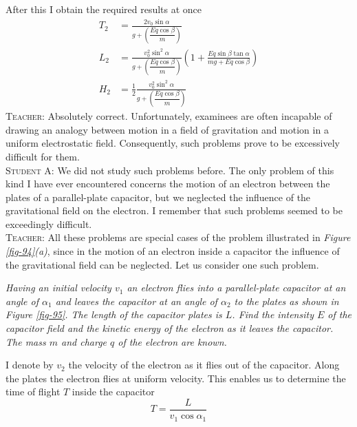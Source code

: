 \documentclass[a4paper,sfsidenotes]{tufte-book}
\begin{document}
After this I obtain the required results at once
\begin{align}%
T_{2} & = \frac{2 v_{0} \sin \alpha}{ g +  \left(\dfrac{E q \cos \beta}{m} \right)} \label{eq-144}\\
L_{2} &= \frac{ v_{0}^{2} \sin^{2} \alpha}{g +  \left(\dfrac{E q \cos \beta}{m} \right)} \left(1 + \frac{Eq \sin \beta \tan \alpha}{mg + Eq \cos \beta} \right) \label{eq-145}\\
H_{2} &=\frac{1}{2} \frac{v_{0}^{2} \sin^{2} \alpha}{g +  \left(\dfrac{E q \cos \beta}{m} \right)} \label{eq-146}
\end{align} 
\textsc{Teacher:} Absolutely correct. Unfortunately, examinees are often incapable of drawing an analogy between motion in a field of gravitation and motion in a uniform electrostatic field. Consequently, such problems prove to be excessively difficult for them.
\\
\textsc{Student A:} We did not study such problems before. The only problem of this kind I have ever encountered concerns the motion of an electron between the plates of a parallel-plate capacitor, but we neglected the influence of the gravitational field on the electron. I remember that such problems seemed to be exceedingly difficult.
\\
\textsc{Teacher:} All these problems are special cases of the problem illustrated in \emph{Figure \ref{fig-94}(a)}, since in the motion of an electron inside a capacitor the influence of the gravitational field can be neglected. Let us consider one such problem. 

\emph{Having an initial velocity $v_{1}$ an electron flies into a parallel-plate capacitor at an angle of $\alpha_{1}$ and leaves the capacitor at an angle of $\alpha_{2}$ to the plates as shown in \emph{Figure \ref{fig-95}}. The length of  the capacitor plates is $L$. Find the intensity $E$ of the capacitor field and the kinetic energy of the electron as it leaves the capacitor. The mass $m$ and charge $q$ of the electron are known.}

I denote by $v_{2}$ the velocity of the electron as it flies out of the capacitor. Along the plates the electron flies at uniform velocity. This enables us to determine the time of flight $T$ inside the capacitor
\begin{equation*}%
T= \frac{L}{v_{1} \cos \alpha_{1}}
\end{equation*}
\end{document}
